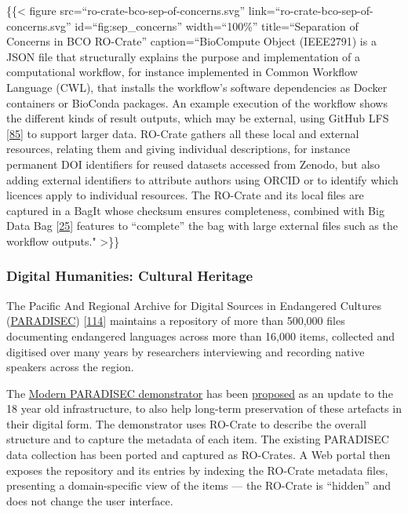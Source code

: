 \{\{\textless{} figure src=``ro-crate-bco-sep-of-concerns.svg''
link=``ro-crate-bco-sep-of-concerns.svg'' id=``fig:sep\_concerns''
width=``100\%'' title=``Separation of Concerns in BCO RO-Crate''
caption=``BioCompute Object (IEEE2791) is a JSON file that structurally
explains the purpose and implementation of a computational workflow, for
instance implemented in Common Workflow Language (CWL), that installs
the workflow's software dependencies as Docker containers or BioConda
packages. An example execution of the workflow shows the different kinds
of result outputs, which may be external, using GitHub LFS
\href{https://docs.github.com/en/repositories/working-with-files/managing-large-files}{{[}85{]}}
to support larger data. RO-Crate gathers all these local and external
resources, relating them and giving individual descriptions, for
instance permanent DOI identifiers for reused datasets accessed from
Zenodo, but also adding external identifiers to attribute authors using
ORCID or to identify which licences apply to individual resources. The
RO-Crate and its local files are captured in a BagIt whose checksum
ensures completeness, combined with Big Data Bag
{[}\href{https://www.research.manchester.ac.uk/portal/files/45989205/bagminid.pdf}{25}{]}
features to ``complete'' the bag with large external files such as the
workflow outputs." \textgreater\}\}

\hypertarget{culturalheritage}{%
\subsubsection{Digital Humanities: Cultural
Heritage}\label{culturalheritage}}

The Pacific And Regional Archive for Digital Sources in Endangered
Cultures (\href{https://www.paradisec.org.au/}{PARADISEC})
{[}\href{http://hdl.handle.net/10125/4567}{114}{]} maintains a
repository of more than 500,000 files documenting endangered languages
across more than 16,000 items, collected and digitised over many years
by researchers interviewing and recording native speakers across the
region.

The \href{https://mod.paradisec.org.au/}{Modern PARADISEC demonstrator}
has been
\href{https://arkisto-platform.github.io/case-studies/paradisec/}{proposed}
as an update to the 18 year old infrastructure, to also help long-term
preservation of these artefacts in their digital form. The demonstrator
uses RO-Crate to describe the overall structure and to capture the
metadata of each item. The existing PARADISEC data collection has been
ported and captured as RO-Crates. A Web portal then exposes the
repository and its entries by indexing the RO-Crate metadata files,
presenting a domain-specific view of the items --- the RO-Crate is
``hidden'' and does not change the user interface.

